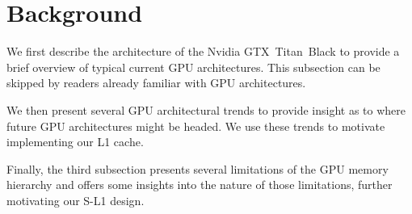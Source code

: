 \section{Background}
\label{sec:background}
We first describe the architecture of the Nvidia GTX~Titan~Black to provide a brief overview of typical
current GPU architectures.
This subsection can be skipped by readers already familiar with GPU architectures.

We then present several GPU architectural trends to provide insight as to where future GPU
architectures might be headed.
We use these trends to motivate implementing our L1 cache.

Finally, the third subsection presents several limitations of the GPU memory hierarchy and offers some
insights into the nature of those limitations, further motivating our S-L1 design.




% 
